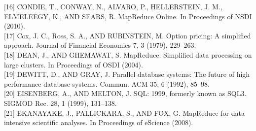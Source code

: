 \documentclass[
]{article}
\begin{document}
{[}16{]} CONDIE, T., CONWAY, N., ALVARO, P., HELLERSTEIN, J. M.,
ELMELEEGY, K., AND SEARS, R. MapReduce Online. In Proceedings of NSDI
(2010).\\
{[}17{]} Cox, J. C., Ross, S. A., AND RUBINSTEIN, M. Option pricing: A
simplified approach. Journal of Financial Economics 7, 3 (1979),
229--263.\\
{[}18{]} DEAN, J., AND GHEMAWAT, S. MapReduce: Simplified data
processing on large clusters. In Proceedings of OSDI (2004).\\
{[}19{]} DEWITT, D., AND GRAY, J. Parallel database systems: The future
of high performance database systems. Commun. ACM 35, 6 (1992),
85--98.\\
{[}20{]} EISENBERG, A., AND MELTON, J. SQL: 1999, formerly known as
SQL3. SIGMOD Rec. 28, 1 (1999), 131--138.\\
{[}21{]} EKANAYAKE, J., PALLICKARA, S., AND FOX, G. MapReduce for data
intensive scientific analyses. In Proceedings of eScience (2008).
\end{document}
